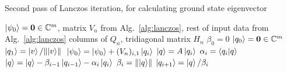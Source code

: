 \begin{algorithm}
	\algrenewcommand{}
	\algrenewcommand{}
	\caption{Second pass of Lanczos iteration, for calculating ground state eigenvector}
	\label{alg:lanczos_second_pass}
	\begin{algorithmic}[1]
		\Require \(\ket{\psi_0} = \vectorbold{0} \in \CC^m\), matrix \(V_n\) from Alg.~\ref{alg:lanczos}, rest of input data from Alg.~\ref{alg:lanczos}
		\Ensure columns of \(Q_n\), tridiagonal matrix \(H_n\)
		\State \(\beta_0 = 0\)
		\State \(\ket{q_0} = \vectorbold{0} \in \CC^m\)
		\State \(\ket{q_1} = \ket{v}/\norm*{\ket{v}}\)
		\State \(\ket{\psi_0} = \ket{\psi_0} + (V_n)_{i,1}\ket{q_i}\) 
		\State \(\ket{q} = A\ket{q_i}\)
		\State \(\alpha_i = \braket{q_i}{q}\)
		\State \(\ket{q} = \ket{q} - \beta_{i-1}\ket{q_{i-1}} - \alpha_i \ket{q_i}\)
		\State \(\beta_i = \norm{\ket{q}} \)
		\State \(\ket{q_{i+1}} = \ket{q}/\beta_i \)
		\EndFor
	\end{algorithmic}
\end{algorithm}

